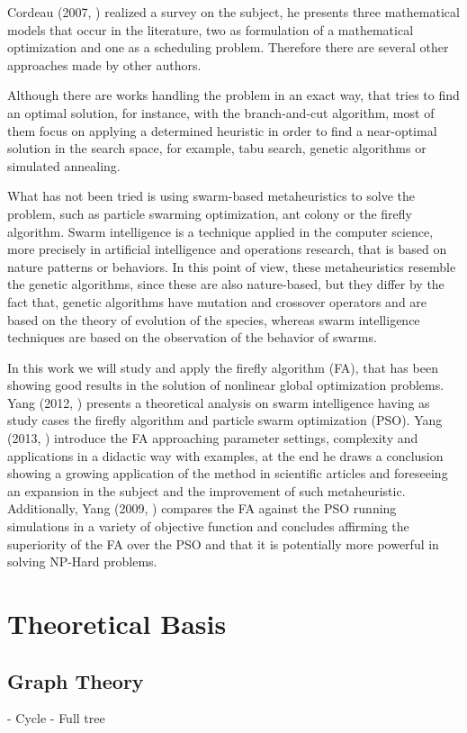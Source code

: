 \documentclass[tuberlin,cic,tc,openright,english,noabntcite]{iiufrgs}
\begin{document}
Cordeau (2007, \cite{Cordeau2007}) realized a survey on the subject, he presents three mathematical models that occur in the literature, two as formulation of a mathematical optimization and one as a scheduling problem. Therefore there are several other approaches made by other authors.

Although there are works handling the problem in an exact way, that tries to find an optimal solution, for instance, with the branch-and-cut algorithm, most of them focus on applying a determined heuristic in order to find a near-optimal solution in the search space, for example, tabu search, genetic algorithms or simulated annealing.

What has not been tried is using swarm-based metaheuristics to solve the problem, such as particle swarming optimization, ant colony or the firefly algorithm. Swarm intelligence is a technique applied in the computer science, more precisely in artificial intelligence and operations research, that is based on nature patterns or behaviors. In this point of view, these metaheuristics resemble the genetic algorithms, since these are also nature-based, but they differ by the fact that, genetic algorithms have mutation and crossover operators and are based on the theory of evolution of the species, whereas swarm intelligence techniques are based on the observation of the behavior of swarms.

In this work we will study and apply the firefly algorithm (FA), that has been showing good results in the solution of nonlinear global optimization problems. Yang (2012, \cite{Yang2012}) presents a theoretical analysis on swarm intelligence having as study cases the firefly algorithm and particle swarm optimization (PSO). Yang (2013, \cite{Yang2013}) introduce the FA approaching parameter settings, complexity and applications in a didactic way with examples, at the end he draws a conclusion showing a growing application of the method in scientific articles and foreseeing an expansion in the subject and the improvement of such metaheuristic. Additionally, Yang (2009, \cite{Yang2009}) compares the FA against the PSO running simulations in a variety of objective function and concludes affirming the superiority of the FA over the PSO and that it is potentially more powerful in solving NP-Hard problems.

\chapter{Theoretical Basis}
\section{Graph Theory}
- Cycle
- Full tree
\end{document}
